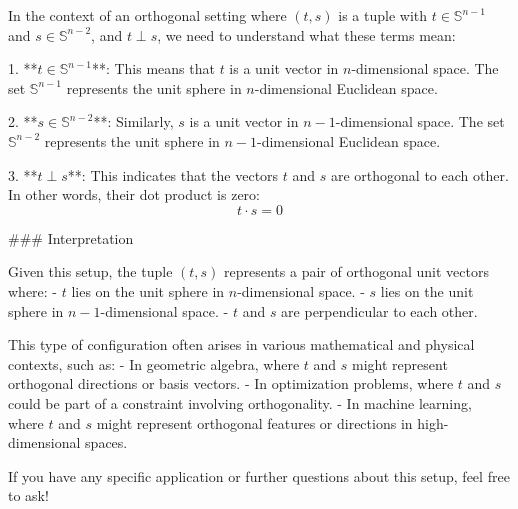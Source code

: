 In the context of an orthogonal setting where \( (t, s) \) is a tuple with \( t \in \mathbb{S}^{n-1} \) and \( s \in \mathbb{S}^{n-2} \), and \( t \perp s \), we need to understand what these terms mean:

1. **\( t \in \mathbb{S}^{n-1} \)**: This means that \( t \) is a unit vector in \( n \)-dimensional space. The set \( \mathbb{S}^{n-1} \) represents the unit sphere in \( n \)-dimensional Euclidean space.

2. **\( s \in \mathbb{S}^{n-2} \)**: Similarly, \( s \) is a unit vector in \( n-1 \)-dimensional space. The set \( \mathbb{S}^{n-2} \) represents the unit sphere in \( n-1 \)-dimensional Euclidean space.

3. **\( t \perp s \)**: This indicates that the vectors \( t \) and \( s \) are orthogonal to each other. In other words, their dot product is zero:
   \[
   t \cdot s = 0
   \]

### Interpretation

Given this setup, the tuple \( (t, s) \) represents a pair of orthogonal unit vectors where:
- \( t \) lies on the unit sphere in \( n \)-dimensional space.
- \( s \) lies on the unit sphere in \( n-1 \)-dimensional space.
- \( t \) and \( s \) are perpendicular to each other.

This type of configuration often arises in various mathematical and physical contexts, such as:
- In geometric algebra, where \( t \) and \( s \) might represent orthogonal directions or basis vectors.
- In optimization problems, where \( t \) and \( s \) could be part of a constraint involving orthogonality.
- In machine learning, where \( t \) and \( s \) might represent orthogonal features or directions in high-dimensional spaces.

If you have any specific application or further questions about this setup, feel free to ask!